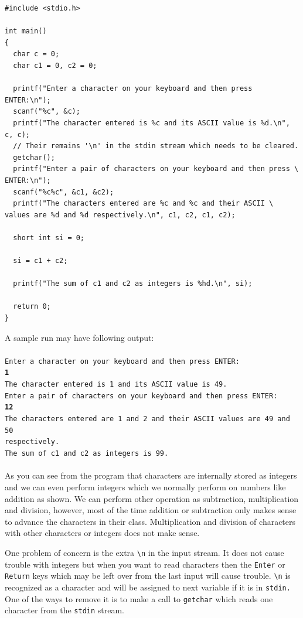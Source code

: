 \begin{Verbatim}[frame=single]
#include <stdio.h>

int main()
{
  char c = 0;
  char c1 = 0, c2 = 0;

  printf("Enter a character on your keyboard and then press ENTER:\n");
  scanf("%c", &c);
  printf("The character entered is %c and its ASCII value is %d.\n", c, c);
  // Their remains '\n' in the stdin stream which needs to be cleared.
  getchar();
  printf("Enter a pair of characters on your keyboard and then press \
ENTER:\n");
  scanf("%c%c", &c1, &c2);
  printf("The characters entered are %c and %c and their ASCII \
values are %d and %d respectively.\n", c1, c2, c1, c2);

  short int si = 0;

  si = c1 + c2;

  printf("The sum of c1 and c2 as integers is %hd.\n", si);

  return 0;
}
\end{Verbatim}

A sample run may have following output:
\\\\\texttt{Enter a character on your keyboard and then press ENTER:\\
\textbf{1}\\
The character entered is 1 and its ASCII value is 49.\\
Enter a pair of characters on your keyboard and then press ENTER:\\
\textbf{12}\\
The characters entered are 1 and 2 and their ASCII values are 49 and 50\\
respectively.\\
The sum of c1 and c2 as integers is 99.\\\\}
As you can see from the program that characters are internally stored as
integers and we can even perform integers which we normally perform on
numbers like addition as shown. We can perform other operation as subtraction,
multiplication and division, however, most of the time addition or subtraction
only makes sense to advance the characters in their class. Multiplication and
division of characters with other characters or integers does not make sense.

One problem of concern is the extra \texttt{\textbackslash n} in the input
stream. It does not cause trouble with integers but when you want to read
characters then the \texttt{Enter} or \texttt{Return} keys which may be left
over from the last input will cause trouble. \texttt{\textbackslash n} is
recognized as a character and will be assigned to next variable if it is in
\texttt{stdin.} One of the ways to remove it is to make a call to
\texttt{getchar} which reads one character from the \texttt{stdin} stream.

